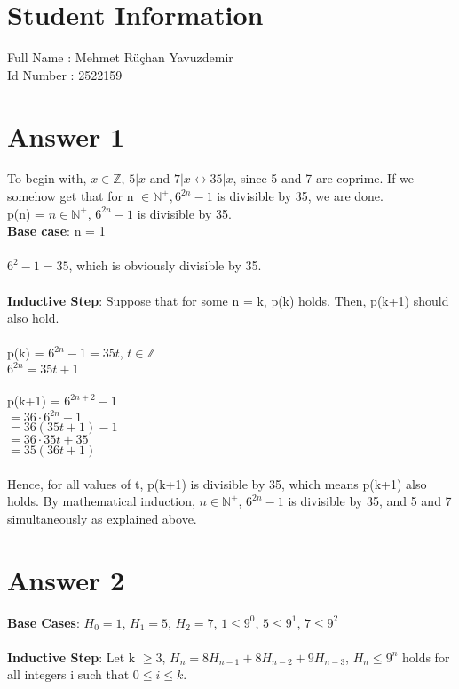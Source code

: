\documentclass[12pt]{article}
\begin{document}
\section*{Student Information }

Full Name : Mehmet Rüçhan Yavuzdemir \\
Id Number : 2522159 \\

\section*{Answer 1}
To begin with, $x\in \mathbb{Z}$, $5 | x $ and $ 7 | x \leftrightarrow 35 | x$, since 5 and 7 are coprime. If we somehow get that for n $\in \mathbb{N^+}, 6^{2n} - 1$ is divisible by 35, we are done.\\

\noindent p(n) = $n\in \mathbb{N^+}$, $6^{2n} - 1$ is divisible by 35. \\
\textbf{Base case}: n = 1 \\\\
    $6^{2}-1 = 35$, which is obviously divisible by 35.\\\\
\textbf{Inductive Step}: Suppose that for some n = k, p(k) holds. Then, p(k+1) should also hold. \\\\
p(k) = $6^{2n} - 1 = 35t$, $t \in \mathbb{Z}$ \\
$6^{2n} = 35t + 1$\\\\
p(k+1) = $6^{2n+2} - 1$ \\
$= 36\cdot6^{2n} - 1$ \\
$= 36(35t + 1) - 1$ \\
$= 36\cdot35t + 35$ \\
$= 35(36t + 1)$ \\\\
Hence, for all values of t, p(k+1) is divisible by 35, which means p(k+1) also holds. By mathematical induction, $n\in \mathbb{N^+}$, $6^{2n} - 1$ is divisible by 35, and 5 and 7 simultaneously as explained above.

\section*{Answer 2}
\textbf{Base Cases}: $H_0 = 1$, $H_1 = 5$, $H_2 = 7$, $1 \leq 9^0$, $5 \leq 9^1$, $7 \leq 9^2$ \\\\
\textbf{Inductive Step}:
Let k $\geq 3$, $H_n = 8H_{n-1} + 8H_{n-2} + 9H_{n-3}$, $H_n \leq 9^n$ holds for all integers i such that $0 \leq i \leq k$.\\
\end{document}
